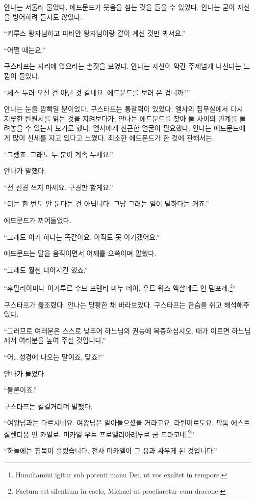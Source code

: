 안나는 서둘러 물었다. 에드문드가 웃음을 참는 것을 들을 수 있었다. 안나는 굳이 자신을 방어하려 들지도 않았다.

``키루스 왕자님하고 파비안 왕자님이랑 같이 계신 것만 봐서요.''

``어떨 때는요.''

구스타프는 자리에 앉으라는 손짓을 보였다. 안나는 자신이 약간 주제넘게 나선다는 느낌이 들었다.

``체스 두러 오신 건 아닌 것 같네요. 에드문드를 보러 온 겁니까?''

안나는 눈을 깜빡일 뿐이었다. 구스타프는 통찰력이 있었다. 엘사의 집무실에서 다시 지루한 탄원서를 읽는 것을 지켜보다가, 안나는 에드문드를 찾아 둘 사이의 관계를 돌려놓을 수 있는지 보기로 했다. 엘사에게 친근한 얼굴이 필요했다. 안나는 에드문드에게 많이 신세를 지고 있다고 느꼈다. 최소한 에드문드가 한 것에 관해서는.

``그랬죠. 그래도 두 분이 계속 두세요.''

안나가 말했다.

``전 신경 쓰지 마세요. 구경만 할게요.''

``더는 한 번도 안 둔다는 건 아닙니다. 그냥 그러는 일이 덜하다는 거죠.''

에드문드가 끼어들었다.

``그래도 이거 하나는 똑같아요. 아직도 못 이기겠어요.''

에드문드는 말을 움직이면서 어깨를 으쓱이며 말했다.

``그래도 훨씬 나아지긴 했죠.''

``후밀리아미니 이기투르 수브 포텐티 마누 데이, 우트 워스 엑살테트 인 템포레.\footnote{Humiliamini igitur sub potenti manu Dei, ut vos exaltet in tempore.}''

구스타프가 읊조렸다. 안나는 당황한 채 바라보았다. 구스타프는 한숨을 쉬고 해석해주었다.

``그러므로 여러분은 스스로 낮추어 하느님의 권능에 복종하십시오. 때가 이르면 하느님께서 여러분을 높여 주실 것입니다.''

``어\ldots\,성경에 나오는 말이죠, 맞죠?''

안나가 물었다.

``물론이죠.''

구스타프는 킬킬거리며 말했다.

``여왕님과는 다르시네요. 여왕님은 알아들으셨을 거라고요, 라틴어로도요. 팍툼 에스트 실렌티움 인 카일로. 미카일 우트 프로엘리아레투르 쿰 드라코네.\footnote{Factum est silentium in caelo, Michael ut proeliaretur cum dracone.}''

``하늘에는 침묵이 흘렀습니다. 천사 미카엘이 그 용과 싸우게 된 것입니다.''

